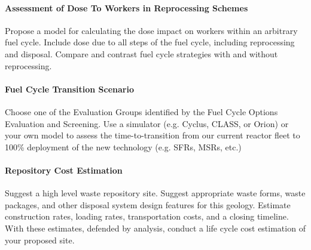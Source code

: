 \documentclass[12pts, answers]{exam}
\begin{document}
\paragraph{Assessment of Dose To Workers in Reprocessing Schemes} Propose a model for
calculating the dose impact on workers within an arbitrary fuel cycle. Include
dose due to all steps of the fuel cycle, including reprocessing and disposal.
Compare and contrast fuel cycle strategies with and without reprocessing.

\paragraph{Fuel Cycle Transition Scenario} Choose one of the Evaluation Groups
identified by the Fuel Cycle Options Evaluation and Screening. Use a simulator
(e.g. Cyclus, CLASS, or Orion) or your own model to assess the
time-to-transition from our current reactor fleet to 100\% deployment of the
new technology (e.g. SFRs, MSRs, etc.)

\paragraph{Repository Cost Estimation} Suggest a high level waste repository
site. Suggest appropriate waste forms, waste packages, and other disposal
system design features for this geology. Estimate construction rates, loading
rates, transportation costs, and a closing timeline. With these estimates,
defended by analysis, conduct a life cycle cost estimation of your proposed
site.

%
%
\end{document}
